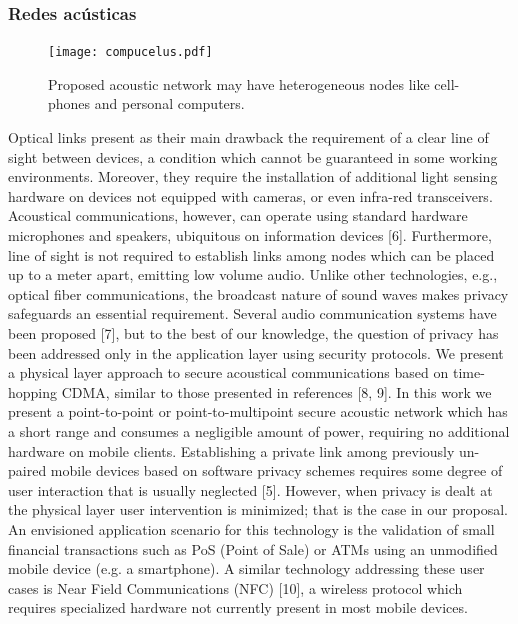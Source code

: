 \documentclass[a4paper,10pt]{report}
\begin{document}
\subsubsection{Redes acústicas}
\begin{figure}[!t]
  \centering
    \texttt{[image: compucelus.pdf]}
    \caption{Proposed acoustic network may have heterogeneous nodes like cell-phones and personal computers.}
    \label{arch:chain}
\end{figure}


Optical links present as their main drawback the requirement of a clear line of sight between devices, a condition which cannot be guaranteed in some working environments. Moreover, they require the installation of additional light sensing hardware on devices not equipped with cameras, or even infra-red transceivers.
Acoustical communications, however, can operate using standard hardware microphones and speakers, ubiquitous on information devices [6]. Furthermore, line of sight is not required to establish links among nodes which can be placed up to a meter apart, emitting low volume audio.
Unlike other technologies, e.g., optical fiber communications, the broadcast nature of sound waves makes privacy safeguards an essential requirement. Several audio communication systems have been proposed [7], but to the best of our knowledge, the question of privacy has been addressed only in the application layer using security protocols. We present a physical layer approach to secure acoustical communications based on time-hopping CDMA, similar to those presented in references [8, 9]. In this work we present a point-to-point or point-to-multipoint secure acoustic network which has a short range and consumes a negligible amount of power, requiring no additional hardware on mobile clients.
Establishing a private link among previously un-paired mobile devices based on software privacy schemes requires some degree of user interaction that is usually neglected [5]. However, when privacy is dealt at the physical layer user intervention is minimized; that is the case in our proposal.
An envisioned application scenario for this technology is the validation of small financial transactions such as PoS (Point of Sale) or ATMs using an unmodified mobile device (e.g. a smartphone). A similar technology addressing these user cases is Near Field Communications (NFC) [10], a wireless protocol which requires specialized hardware not currently present in most mobile devices.
\end{document}
